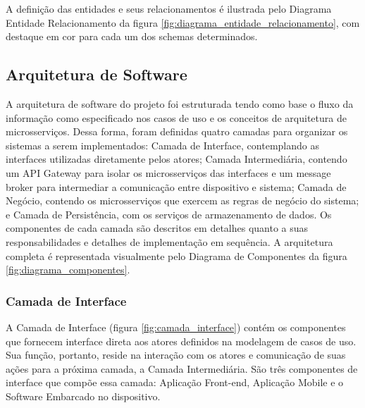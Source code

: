 A definição das entidades e seus relacionamentos é ilustrada pelo Diagrama Entidade Relacionamento da figura \ref{fig:diagrama_entidade_relacionamento}, com destaque em cor para cada um dos schemas determinados.

\subsection{Arquitetura de Software}

A arquitetura de software do projeto foi estruturada tendo como base o fluxo da informação como especificado nos casos de uso e os conceitos de arquitetura de microsserviços. Dessa forma, foram definidas quatro camadas para organizar os sistemas a serem implementados: Camada de Interface, contemplando as interfaces utilizadas diretamente pelos atores; Camada Intermediária, contendo um API Gateway para isolar os microsserviços das interfaces e um message broker para intermediar a comunicação entre dispositivo e sistema; Camada de Negócio, contendo os microsserviços que exercem as regras de negócio do sistema; e Camada de Persistência, com os serviços de armazenamento de dados. Os componentes de cada camada são descritos em detalhes quanto a suas responsabilidades e detalhes de implementação em sequência. A arquitetura completa é representada visualmente pelo Diagrama de Componentes da figura \ref{fig:diagrama_componentes}.

\subsubsection{Camada de Interface}
A Camada de Interface (figura \ref{fig:camada_interface}) contém os componentes que fornecem interface direta aos atores definidos na modelagem de casos de uso. Sua função, portanto, reside na interação com os atores e comunicação de suas ações para a próxima camada, a Camada Intermediária. São três componentes de interface que compõe essa camada: Aplicação Front-end, Aplicação Mobile e o Software Embarcado no dispositivo. 

